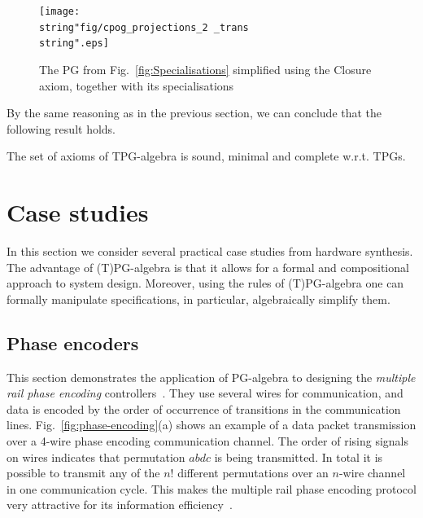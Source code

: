 \begin{figure}
\begin{centering}
\texttt{[image: \\string"fig/cpog\_projections\_2 \_trans\\string".eps]}
\par\end{centering}

\caption{The PG from Fig.~\ref{fig:Specialisations} simplified using the
Closure axiom, together with its specialisations\label{fig:The-simplified-CG-from}}
\vspace{-6mm}
\end{figure}


By the same reasoning as in the previous section, we can conclude
that the following result holds.
\begin{thm}
 The set of axioms of TPG-algebra
is sound, minimal and complete w.r.t. TPGs.
\end{thm}

\section{Case studies}

In this section we consider several practical case studies from hardware
synthesis. The advantage of (T)PG-algebra is that it allows for a
formal and compositional approach to system design. Moreover, using
the rules of (T)PG-algebra one can formally manipulate specifications,
in particular, algebraically simplify them.


\subsection{Phase encoders}

This section demonstrates the application of PG-algebra to designing
the \emph{multiple rail phase encoding} controllers\emph{~}\cite{2006_cdalessandro_async}.
They use several wires for communication, and data is encoded by the
order of occurrence of transitions in the communication lines. Fig.~\ref{fig:phase-encoding}(a)
shows an example of a data packet transmission over a 4-wire phase
encoding communication channel. The order of rising signals on wires
indicates that permutation $abdc$ is being transmitted. In total
it is possible to transmit any of the $n!$ different permutations
over an $n$-wire channel in one communication cycle. This makes the
multiple rail phase encoding protocol very attractive for its information
efficiency~\cite{2010_mokhov_ieee}. 

